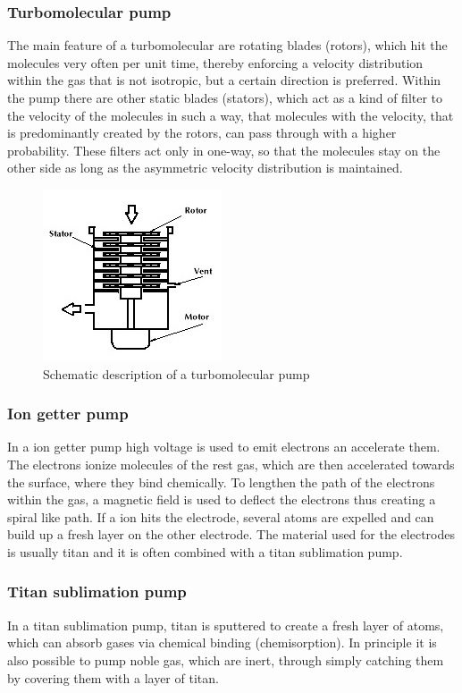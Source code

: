 \documentclass[a4paper]{scrartcl}
\numberwithin{equation}{section}
\numberwithin{figure}{section}
\numberwithin{table}{section}
\begin{document}
\subsubsection{Turbomolecular pump}
The main feature of a turbomolecular are rotating blades (rotors), which hit the molecules very often per unit time, thereby enforcing a velocity distribution within the gas that is not isotropic, but a certain direction is preferred. Within the pump there are other static blades (stators), which act as a kind of filter to the velocity of the molecules in such a way, that molecules with the velocity, that is predominantly created by the rotors, can pass through with a higher probability. These filters act only in one-way, so that the molecules stay on the other side as long as the asymmetric velocity distribution is maintained. 
\begin{figure}
  \centering
  
   	\includegraphics[width=0.3\linewidth]{pic/tu.jpg}

 \caption{\small Schematic description of a turbomolecular pump}
        \label{fig:turbo}
\end{figure}


\subsubsection{Ion getter pump}
In a ion getter pump high voltage is used to emit electrons an accelerate them. The electrons ionize molecules of the rest gas, which are then accelerated towards the surface, where they bind chemically. To lengthen the path of the electrons within the gas, a magnetic field is used to deflect the electrons thus creating a spiral like path. If a ion hits the electrode, several atoms are expelled and can build up a fresh layer on the other electrode. The material used for the electrodes is usually titan and it is often combined with a titan sublimation pump.

\subsubsection{Titan sublimation pump}
In a titan sublimation pump, titan is sputtered to create a fresh layer of atoms, which can absorb gases via chemical binding (chemisorption). In principle it is also possible to pump noble gas, which are inert, through simply catching them by covering them with a layer of titan. 
\end{document}
